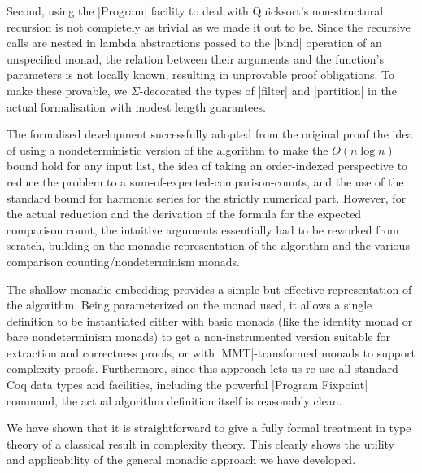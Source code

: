 \documentclass[runningheads]{llncs}
\begin{document}
Second, using the |Program| facility to deal with Quicksort's non-structural recursion is not completely as trivial as we made it out to be. Since the recursive calls are nested in lambda abstractions passed to the |bind| operation of an unspecified monad, the relation between their arguments and the function's parameters is not locally known, resulting in unprovable proof obligations. To make these provable, we $\Sigma$-decorated the types of |filter| and |partition| in the actual formalisation with modest length guarantees.

The formalised development successfully adopted from the original proof the idea of using a nondeterministic version of the algorithm to make the $O(n \log n)$ bound hold for any input list, the idea of taking an order-indexed perspective to reduce the problem to a sum-of-expected-comparison-counts, and the use of the standard bound for harmonic series for the strictly numerical part. However, for the actual reduction and the derivation of the formula for the expected comparison count, the intuitive arguments essentially had to be reworked from scratch, building on the monadic representation of the algorithm and the various comparison counting/nondeterminism monads.

The shallow monadic embedding provides a simple but effective representation of the algorithm. Being parameterized on the monad used, it allows a single definition to be instantiated either with basic monads (like the identity monad or bare nondeterminism monads) to get a non-instrumented version suitable for extraction and correctness proofs, or with |MMT|-transformed monads to support complexity proofs. Furthermore, since 
    this approach lets us re-use all standard Coq data types and facilities, including the powerful |Program Fixpoint| command, the actual algorithm definition itself is reasonably clean.

We have shown that it is straightforward to give a fully formal treatment in type theory of a classical result in complexity theory. This clearly shows the utility and applicability of the general monadic 
    approach 
we have developed. 



\end{document}
